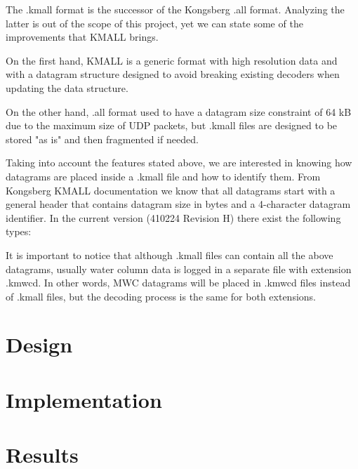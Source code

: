 The .kmall format is the successor of the Kongsberg .all format. Analyzing the latter is out of the scope of this project, yet we can state some of the improvements that KMALL brings. 

On the first hand, KMALL is a generic format with high resolution data and with a datagram structure designed to avoid breaking existing decoders when updating the data structure.

On the other hand, .all format used to have a datagram size constraint of 64 kB due to the maximum size of UDP packets, but .kmall files are designed to be stored "as is" and then fragmented if needed.

Taking into account the features stated above, we are interested in knowing how datagrams are placed inside a .kmall file and how to identify them. From Kongsberg KMALL documentation we know that all datagrams start with a general header that contains datagram size in bytes and a 4-character datagram identifier. In the current version (410224 Revision H) there exist the following types:

\begin{comment}
Incloure taula com la del dOxygen.
\end{comment}

It is important to notice that although .kmall files can contain all the above datagrams, usually water column data is logged in a separate file with extension .kmwcd. In other words, MWC datagrams will be placed in .kmwcd files instead of .kmall files, but the decoding process is the same for both extensions.

\begin{comment}
Incloure figura amb el datagrama MWC de la revisió actual.
\end{comment}

\section{Design}
\begin{comment}
On it. Les idees són: no trencar datagrames, comprimir només MWC i potser MRZ (amb Python he analitzat que és worth de comprimir i què no). L'algoritme de compressió es basarà en l'anterior fet pels fitxer .wcd de KONGSBERG.
\end{comment}

\section{Implementation}
\begin{comment}
Implementació amb C de l'algoritme. El codi anirà als annexes (a poder ser confidencials).
\end{comment}

\section{Results}
\begin{comment}
No ens precipitem.
\end{comment}